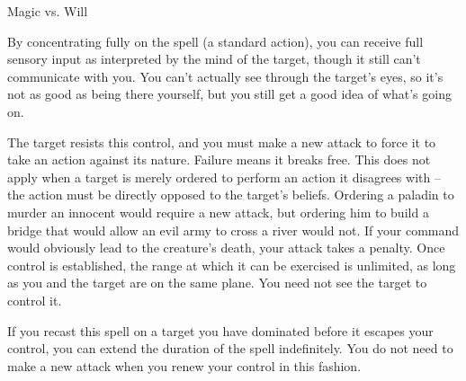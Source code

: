 \begin{spellcontent}
\begin{spellattack}{Magic vs. Will}
        \par By concentrating fully on the spell (a standard action), you can receive full sensory input as interpreted by the mind of the target, though it still can't communicate with you. You can't actually see through the target's eyes, so it's not as good as being there yourself, but you still get a good idea of what's going on.
        \par The target resists this control, and you must make a new attack to force it to take an action against its nature. Failure means it breaks free. This does not apply when a target is merely ordered to perform an action it disagrees with -- the action must be directly opposed to the target's beliefs. Ordering a paladin to murder an innocent would require a new attack, but ordering him to build a bridge that would allow an evil army to cross a river would not. If your command would obviously lead to the creature's death, your attack takes a  penalty. Once control is established, the range at which it can be exercised is unlimited, as long as you and the target are on the same plane. You need not see the target to control it.
        \par If you recast this spell on a target you have dominated before it escapes your control, you can extend the duration of the spell indefinitely. You do not need to make a new attack when you renew your control in this fashion.
    \end{spellattack}
\end{spellcontent}
\begin{spellfooter}

\end{spellfooter}

